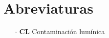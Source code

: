 \chapter{Abreviaturas}

\begin{itemize}

\item[$\cdot$] \textbf{CL} Contaminación lumínica
			
\end{itemize}